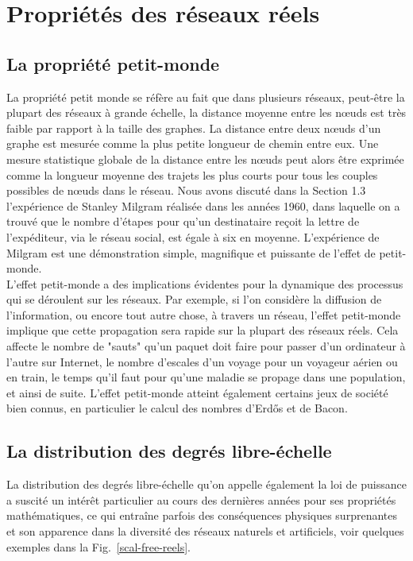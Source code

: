 \section{Propriétés des réseaux réels}
\subsection{La propriété petit-monde}
La propriété petit monde se réfère au fait que dans plusieurs réseaux, peut-être la plupart des réseaux à grande échelle, la distance moyenne entre les nœuds est très faible par rapport à la taille des graphes. La distance entre deux nœuds d'un graphe est mesurée comme la plus petite longueur de chemin entre eux. Une mesure statistique globale de la distance entre les nœuds peut alors être exprimée comme la longueur moyenne des trajets  les plus courts pour tous les couples possibles de nœuds dans le réseau. Nous avons discuté dans la Section 1.3 l'expérience de Stanley Milgram réalisée dans les années 1960, dans laquelle on a trouvé que le nombre d'étapes pour qu'un destinataire reçoit la lettre de l'expéditeur, via le réseau social, est égale à six en moyenne. L'expérience de Milgram est une démonstration simple, magnifique et puissante de l'effet de
petit-monde.\\
L'effet petit-monde a des implications évidentes pour la dynamique des processus qui se déroulent sur les réseaux. Par exemple, si l'on considère la diffusion de l'information, ou encore tout autre chose, à travers un réseau, l'effet petit-monde implique que cette propagation sera rapide sur la plupart des réseaux réels. Cela affecte le nombre de "sauts" qu'un paquet doit faire pour passer d'un ordinateur à l'autre sur Internet, le nombre d'escales d'un voyage pour un voyageur aérien ou en train, le temps qu'il faut pour qu'une maladie se propage dans
une population, et ainsi de suite. L'effet petit-monde atteint également certains jeux de société bien connus, en particulier le calcul des nombres d'Erd\H{o}s \cite{RG1999} et de Bacon.

\subsection{La distribution des degrés libre-échelle}
\label{s-libre-echelle}
La distribution des degrés libre-échelle qu'on appelle également la loi de puissance a suscité un intérêt particulier au cours des dernières années pour ses propriétés mathématiques, ce qui entraîne parfois des conséquences physiques surprenantes et son apparence dans la diversité des réseaux naturels et artificiels, voir quelques exemples dans la Fig.~\ref{scal-free-reels}.\\

